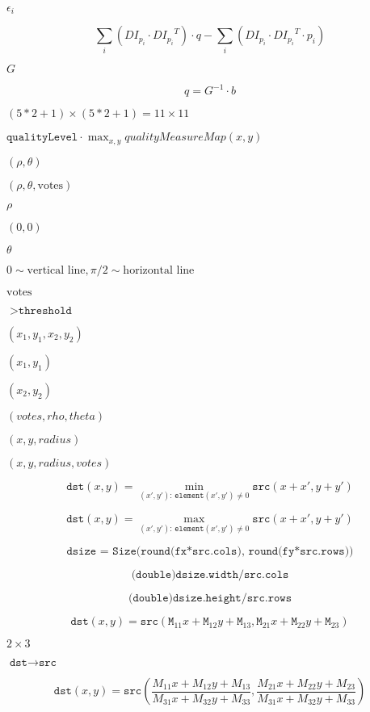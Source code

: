 \documentclass{article}
\begin{document}
$\epsilon_i$
\pagebreak

\[\sum _i(DI_{p_i} \cdot {DI_{p_i}}^T) \cdot q - \sum _i(DI_{p_i} \cdot {DI_{p_i}}^T \cdot p_i)\]
\pagebreak

$G$
\pagebreak

\[q = G^{-1} \cdot b\]
\pagebreak

$(5*2+1) \times (5*2+1) = 11 \times 11$
\pagebreak

$\texttt{qualityLevel} \cdot \max_{x,y} qualityMeasureMap(x,y)$
\pagebreak

$(\rho, \theta)$
\pagebreak

$(\rho, \theta, \textrm{votes})$
\pagebreak

$\rho$
\pagebreak

$(0,0)$
\pagebreak

$\theta$
\pagebreak

$0 \sim \textrm{vertical line}, \pi/2 \sim \textrm{horizontal line}$
\pagebreak

$\textrm{votes}$
\pagebreak

$>\texttt{threshold}$
\pagebreak

$(x_1, y_1, x_2, y_2)$
\pagebreak

$(x_1,y_1)$
\pagebreak

$(x_2, y_2)$
\pagebreak

$(votes, rho, theta)$
\pagebreak

$(x, y, radius)$
\pagebreak

$(x, y, radius, votes)$
\pagebreak

\[\texttt{dst} (x,y) = \min _{(x',y'): \, \texttt{element} (x',y') \ne0 } \texttt{src} (x+x',y+y')\]
\pagebreak

\[\texttt{dst} (x,y) = \max _{(x',y'): \, \texttt{element} (x',y') \ne0 } \texttt{src} (x+x',y+y')\]
\pagebreak

\[\texttt{dsize = Size(round(fx*src.cols), round(fy*src.rows))}\]
\pagebreak

\[\texttt{(double)dsize.width/src.cols}\]
\pagebreak

\[\texttt{(double)dsize.height/src.rows}\]
\pagebreak

\[\texttt{dst} (x,y) = \texttt{src} ( \texttt{M} _{11} x + \texttt{M} _{12} y + \texttt{M} _{13}, \texttt{M} _{21} x + \texttt{M} _{22} y + \texttt{M} _{23})\]
\pagebreak

$2\times 3$
\pagebreak

$\texttt{dst}\rightarrow\texttt{src}$
\pagebreak

\[\texttt{dst} (x,y) = \texttt{src} \left ( \frac{M_{11} x + M_{12} y + M_{13}}{M_{31} x + M_{32} y + M_{33}} , \frac{M_{21} x + M_{22} y + M_{23}}{M_{31} x + M_{32} y + M_{33}} \right )\]
\pagebreak
\end{document}
